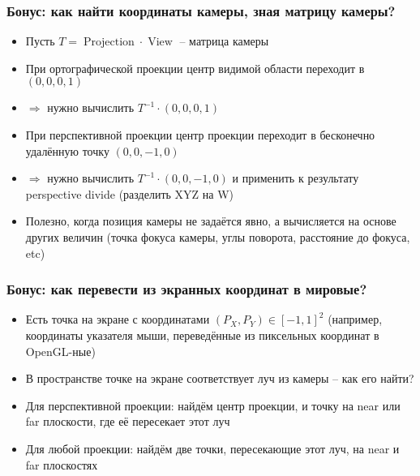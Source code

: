 \documentclass[10pt]{beamer}
\begin{document}
\begin{frame}[fragile]
\frametitle{Бонус: как найти координаты камеры, зная матрицу камеры?}
\begin{itemize}
\item Пусть \begin{math}T=\operatorname{Projection}\cdot\operatorname{View}\end{math} -- матрица камеры
\pause
\item При ортографической проекции центр видимой области переходит в \begin{math}(0,0,0,1)\end{math}
\pause
\item \begin{math}\Longrightarrow\end{math} нужно вычислить \begin{math}T^{-1} \cdot (0,0,0,1)\end{math}
\pause
\item При перспективной проекции центр проекции переходит в бесконечно удалённую точку \begin{math}(0,0,-1,0)\end{math}
\pause
\item \begin{math}\Longrightarrow\end{math} нужно вычислить \begin{math}T^{-1} \cdot (0,0,-1,0)\end{math} и применить к результату perspective divide (разделить XYZ на W)
\pause
\item Полезно, когда позиция камеры не задаётся явно, а вычисляется на основе других величин (точка фокуса камеры, углы поворота, расстояние до фокуса, etc)
\end{itemize}
\end{frame}

\begin{frame}[fragile]
\frametitle{Бонус: как перевести из экранных координат в мировые?}
\begin{itemize}
\item Есть точка на экране с координатами \begin{math}(P_X, P_Y) \in [-1, 1]^2\end{math} (например, координаты указателя мыши, переведённые из пиксельных координат в OpenGL-ные)
\pause
\item В пространстве точке на экране соответствует луч из камеры -- как его найти?
\pause
\item Для перспективной проекции: найдём центр проекции, и точку на near или far плоскости, где её пересекает этот луч
\pause
\item Для любой проекции: найдём две точки, пересекающие этот луч, на near и far плоскостях
\end{itemize}
\end{frame}
\end{document}

